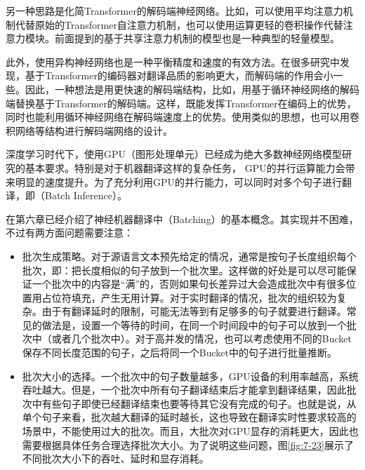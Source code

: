\parinterval 另一种思路是化简Transformer的解码端神经网络。比如，可以使用平均注意力机制代替原始的Transformer自注意力机制\cite{DBLP:journals/corr/abs-1805-00631}，也可以使用运算更轻的卷积操作代替注意力模块\cite{Wu2019PayLA}。前面提到的基于共享注意力机制的模型也是一种典型的轻量模型\cite{Xiao2019SharingAW}。

\parinterval 此外，使用异构神经网络也是一种平衡精度和速度的有效方法。在很多研究中发现，基于Transformer的编码器对翻译品质的影响更大，而解码端的作用会小一些。因此，一种想法是用更快速的解码端结构，比如，用基于循环神经网络的解码端替换基于Transformer的解码端\cite{Chen2018TheBO}。这样，既能发挥Transformer在编码上的优势，同时也能利用循环神经网络在解码端速度上的优势。使用类似的思想，也可以用卷积网络等结构进行解码端网络的设计。

\vspace{0.5em}
\vspace{0.5em}

\parinterval 深度学习时代下，使用GPU（图形处理单元）已经成为绝大多数神经网络模型研究的基本要求。特别是对于机器翻译这样的复杂任务， GPU的并行运算能力会带来明显的速度提升。为了充分利用GPU的并行能力，可以同时对多个句子进行翻译，即{\small{}}（Batch Inference）。

\parinterval 在第六章已经介绍了神经机器翻译中{\small{}}（Batching）的基本概念。其实现并不困难，不过有两方面问题需要注意：

\begin{itemize}
\vspace{0.5em}
\item 批次生成策略。对于源语言文本预先给定的情况，通常是按句子长度组织每个批次，即：把长度相似的句子放到一个批次里。这样做的好处是可以尽可能保证一个批次中的内容是``满''的，否则如果句长差异过大会造成批次中有很多位置用占位符填充，产生无用计算。对于实时翻译的情况，批次的组织较为复杂。由于有翻译延时的限制，可能无法等到有足够多的句子就要进行翻译。常见的做法是，设置一个等待的时间，在同一个时间段中的句子可以放到一个批次中（或者几个批次中）。对于高并发的情况，也可以考虑使用不同的Bucket保存不同长度范围的句子，之后将同一个Bucket中的句子进行批量推断。
\vspace{0.5em}
\item 批次大小的选择。一个批次中的句子数量越多，GPU设备的利用率越高，系统吞吐越大。但是，一个批次中所有句子翻译结束后才能拿到翻译结果，因此批次中有些句子即使已经翻译结束也要等待其它没有完成的句子。也就是说，从单个句子来看，批次越大翻译的延时越长，这也导致在翻译实时性要求较高的场景中，不能使用过大的批次。而且，大批次对GPU显存的消耗更大，因此也需要根据具体任务合理选择批次大小。为了说明这些问题，图\ref{fig:7-23}展示了不同批次大小下的吞吐、延时和显存消耗。
\vspace{0.5em}
\end{itemize}

